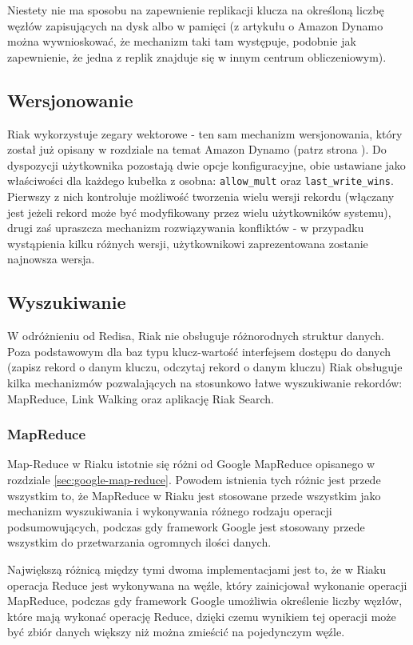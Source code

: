 Niestety nie ma sposobu na zapewnienie replikacji klucza na określoną liczbę węzłów zapisujących na dysk albo w pamięci (z artykułu o Amazon Dynamo można wywnioskować, że mechanizm taki tam występuje, podobnie jak zapewnienie, że jedna z replik znajduje się w innym centrum obliczeniowym).

\subsection*{Wersjonowanie}

Riak wykorzystuje zegary wektorowe - ten sam mechanizm wersjonowania, który został już opisany w rozdziale na temat Amazon Dynamo (patrz strona \pageref{sec:dynamo-vector-clocks}).
Do dyspozycji użytkownika pozostają dwie opcje konfiguracyjne, obie ustawiane jako właściwości dla każdego kubełka z osobna: \verb+allow_mult+ oraz \verb+last_write_wins+.
Pierwszy z nich kontroluje możliwość tworzenia wielu wersji rekordu (włączany jest jeżeli rekord może być modyfikowany przez wielu użytkowników systemu), drugi zaś upraszcza mechanizm rozwiązywania konfliktów - w przypadku wystąpienia kilku różnych wersji, użytkownikowi zaprezentowana zostanie najnowsza wersja.

\subsection*{Wyszukiwanie}

W odróżnieniu od Redisa, Riak nie obsługuje różnorodnych struktur danych.
Poza podstawowym dla baz typu klucz-wartość interfejsem dostępu do danych (zapisz rekord o danym kluczu, odczytaj rekord o danym kluczu) Riak obsługuje kilka mechanizmów pozwalających na stosunkowo łatwe wyszukiwanie rekordów: MapReduce, Link Walking oraz aplikację Riak Search.

\subsubsection*{MapReduce}

Map-Reduce w Riaku istotnie się różni od Google MapReduce opisanego w rozdziale \ref{sec:google-map-reduce}.
Powodem istnienia tych różnic jest przede wszystkim to, że MapReduce w Riaku jest stosowane przede wszystkim jako mechanizm wyszukiwania i wykonywania różnego rodzaju operacji podsumowujących, podczas gdy framework Google jest stosowany przede wszystkim do przetwarzania ogromnych ilości danych.

Największą różnicą między tymi dwoma implementacjami jest to, że w Riaku operacja Reduce jest wykonywana na węźle, który zainicjował wykonanie operacji MapReduce, podczas gdy framework Google umożliwia określenie liczby węzłów, które mają wykonać operację Reduce, dzięki czemu wynikiem tej operacji może być zbiór danych większy niż można zmieścić na pojedynczym węźle.

